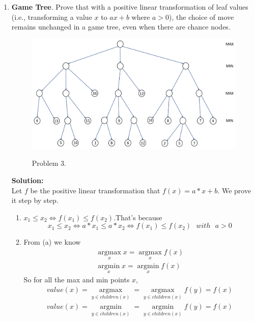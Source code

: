 \documentclass{article}
\begin{document}
\begin{enumerate}
    \item \textbf{Game Tree}.
Prove that with a positive linear transformation of leaf values (i.e., transforming a value $x$ to $ax + b$ where $a > 0$), the choice of move remains unchanged in a game tree, even when there are chance nodes.\\
    \begin{figure}[h]
        \centering
        \includegraphics[width=12cm]{figs/fig_p3.png}
        \label{fig:p3}
        \caption{Problem 3.}
    \end{figure}
\par
\textbf{Solution:}\\
Let $f$ be the positive linear transformation that $f(x)=a*x+b$. We prove it step by step.
\begin{enumerate}
    \item $x_1\le x_2\Leftrightarrow f(x_1)\le f(x_2)$.That's because 
    \begin{equation}
        x_1\le x_2\Leftrightarrow a*x_1\le a*x_2\Leftrightarrow f(x_1)\le f(x_2)~~~with~~~a>0
    \end{equation}
    \item From (a) we know
    \begin{equation}
    \begin{aligned}
        \mathop{\arg\max}\limits_{x}x=\mathop{\arg\max}\limits_{x}f(x)\\
        \mathop{\arg\min}\limits_{x}x=\mathop{\arg\min}\limits_{x}f(x)
    \end{aligned}
    \end{equation}
    So for all the max and min points $x$,
    \begin{equation}
    \begin{aligned}
         value(x)=\mathop{\arg\max}\limits_{y\in children(x)}=\mathop{\arg\max}\limits_{y\in children(x)}f(y)=f(x)\\
         value(x)=\mathop{\arg\min}\limits_{y\in children(x)}=\mathop{\arg\min}\limits_{y\in children(x)}f(y)=f(x)

\end{aligned}
\end{equation}
\end{enumerate}
\end{enumerate}
\end{document}
